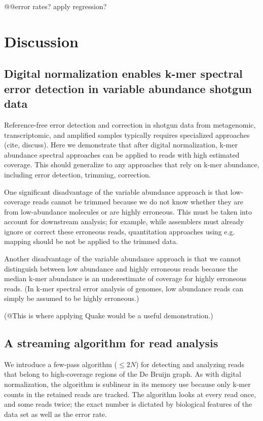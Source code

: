 \documentclass{article}
\begin{document}
@@error rates? apply regression?

\section{Discussion}

\subsection{Digital normalization enables k-mer spectral error detection in variable abundance shotgun data}

Reference-free error detection and correction in shotgun data from
metagenomic, transcriptomic, and amplified samples typically requires
specialized approaches (cite, discuss).  Here we demonstrate that
after digital normalization, k-mer abundance spectral approaches can
be applied to reads with high estimated coverage.  This should
generalize to any approaches that rely on k-mer abundance, including
error detection, trimming, correction.

One significant disadvantage of the variable abundance approach is
that low-coverage reads cannot be trimmed because we do not know
whether they are from low-abundance molecules or are highly erroneous.
This must be taken into account for downstream analysis; for example,
while assemblers must already ignore or correct these erroneous reads,
quantitation approaches using e.g. mapping should be not be applied
to the trimmed data.

Another disadvantage of the variable abundance approach is that we cannot
distinguish between low abundance and highly erroneous reads because the
median k-mer abundance is an underestimate of coverage for highly erroneous
reads.  (In k-mer spectral error analysis of genomes, low abundance reads
can simply be assumed to be highly erroneous.)

(@This is where applying Quake would be a useful demonstration.)


\subsection{A streaming algorithm for read analysis}

We introduce a few-pass algorithm ($\leq 2N$) for detecting and
analyzing reads that belong to high-coverage regions of the De Bruijn
graph.  As with digital normalization, the algorithm is sublinear in
its memory use because only k-mer counts in the retained reads are
tracked.  The algorithm looks at every read once, and some reads
twice; the exact number is dictated by biological features of the
data set as well as the error rate.
\end{document}
